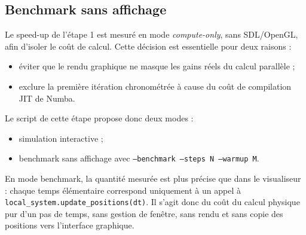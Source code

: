\subsection{Benchmark sans affichage}

Le speed-up de l'étape 1 est mesuré en mode \textit{compute-only}, sans SDL/OpenGL, afin d'isoler le coût de calcul. Cette décision est essentielle pour deux raisons :
\begin{itemize}
    \item éviter que le rendu graphique ne masque les gains réels du calcul parallèle ;
    \item exclure la première itération chronométrée à cause du coût de compilation JIT de Numba.
\end{itemize}

Le script de cette étape propose donc deux modes :
\begin{itemize}
    \item simulation interactive ;
    \item benchmark sans affichage avec \texttt{--benchmark --steps N --warmup M}.
\end{itemize}

En mode benchmark, la quantité mesurée est plus précise que dans le visualiseur : chaque temps élémentaire correspond uniquement à un appel à \texttt{local\_system.update\_positions(dt)}. Il s'agit donc du coût du calcul physique pur d'un pas de temps, sans gestion de fenêtre, sans rendu et sans copie des positions vers l'interface graphique.

